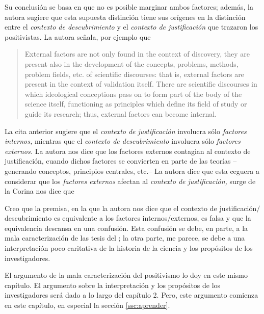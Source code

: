 Su conclusión se basa en que no es posible marginar ambos factores; además, la autora sugiere que esta supuesta distinción tiene sus orígenes en la distinción entre el \emph{contexto de descubrimiento} y el \emph{contexto de justificación} que trazaron los positivistas.
La autora señala, por ejemplo que

\begin{quote}
	External factors are not only found in the context of discovery, they are present also in the development of the concepts, problems, methods, problem fields, etc. of scientific discourses: that is, external factors are present in the context of validation itself.
	There are scientific discourses in which ideological conceptions pass on to form part of the body of the science itself, functioning as principles which define its field of study or guide its research; thus, external factors can become internal. \parencite[p. 85]{Yturbe1995}
\end{quote}

La cita anterior sugiere que el \emph{contexto de justificación} involucra sólo \emph{factores internos,} mientras que el \emph{contexto de descubrimiento} involucra sólo \emph{factores externos.}
La autora nos dice que los factores externos contagian al contexto de justificación, cuando dichos factores se convierten en parte de las teorías --generando conceptos, principios centrales, etc.--
La autora dice que esta ceguera a considerar que los \emph{factores externos} afectan al \emph{contexto de justificación,} surge de la 
Corina nos dice que  \parencite[p. 75]{Yturbe1995}

Creo que la premisa, en la que la autora nos dice que el contexto de justificación$/$descubrimiento es equivalente a los factores internos$/$externos, es falsa y que la equivalencia descansa en una confusión.
Esta confusión se debe, en parte, a la mala caracterización de las tesis del ; la otra parte, me parece, se debe a una interpretación poco caritativa de la historia de la ciencia y los propósitos de los investigadores.

El argumento de la mala caracterización del positivismo lo doy en este mismo capítulo.
El argumento sobre la interpretación y los propósitos de los investigadores será dado a lo largo del capítulo 2.
Pero, este argumento comienza en este capítulo, en especial la sección \ref{ssc:aprender}.

